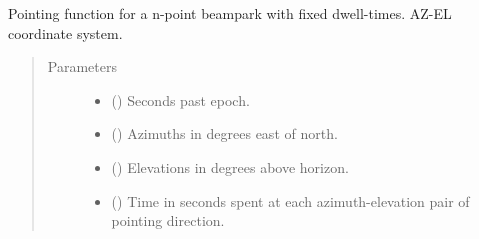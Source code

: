 \documentclass[letterpaper,10pt,english]{sphinxmanual}
\begin{document}
\begin{fulllineitems}
\label{\detokenize{modules/radar_scan_library:radar_scan_library.point_n_beampark}}
Pointing function for a n-point beampark with fixed dwell-times. AZ-EL coordinate system.
\begin{quote}\begin{description}
\item[{Parameters}] \leavevmode\begin{itemize}
\item {} 
 () \textendash{} Seconds past epoch.

\item {} 
 () \textendash{} Azimuths in degrees east of north.

\item {} 
 () \textendash{} Elevations in degrees above horizon.

\item {} 
 () \textendash{} Time in seconds spent at each azimuth-elevation pair of pointing direction.

\end{itemize}

\end{description}\end{quote}

\end{fulllineitems}

\end{document}
